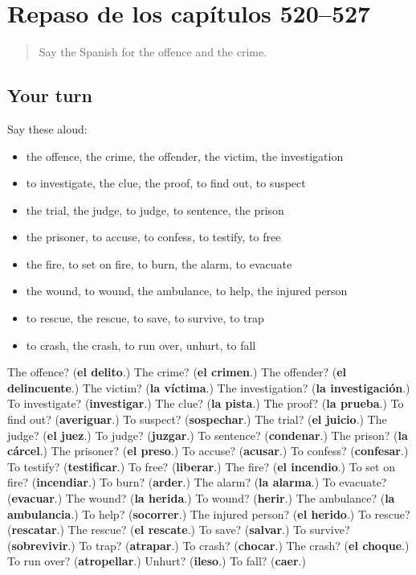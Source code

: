 \section[(dialogue)]{Repaso de los capítulos 520–527}

\label{lesson:ES-R527-repaso-520-527}



\begin{quote}
Say the Spanish for the offence and the crime.
\end{quote}

\subsection*{Your turn}
Say these aloud:

\begin{itemize}
\raggedright
  \item the offence, the crime, the offender, the victim, the investigation
  \item to investigate, the clue, the proof, to find out, to suspect
  \item the trial, the judge, to judge, to sentence, the prison
  \item the prisoner, to accuse, to confess, to testify, to free
  \item the fire, to set on fire, to burn, the alarm, to evacuate
  \item the wound, to wound, the ambulance, to help, the injured person
  \item to rescue, the rescue, to save, to survive, to trap
  \item to crash, the crash, to run over, unhurt, to fall
\end{itemize}

\begin{tcolorbox}[breakable,colback=teal!4,colframe=teal!35!black,title={Before you move on}]
The offence? (\textbf{el delito}.) The crime? (\textbf{el crimen}.) The offender? (\textbf{el delincuente}.) The victim? (\textbf{la víctima}.) The investigation? (\textbf{la investigación}.) To investigate? (\textbf{investigar}.) The clue? (\textbf{la pista}.) The proof? (\textbf{la prueba}.) To find out? (\textbf{averiguar}.) To suspect? (\textbf{sospechar}.) The trial? (\textbf{el juicio}.) The judge? (\textbf{el juez}.) To judge? (\textbf{juzgar}.) To sentence? (\textbf{condenar}.) The prison? (\textbf{la cárcel}.) The prisoner? (\textbf{el preso}.) To accuse? (\textbf{acusar}.) To confess? (\textbf{confesar}.) To testify? (\textbf{testificar}.) To free? (\textbf{liberar}.) The fire? (\textbf{el incendio}.) To set on fire? (\textbf{incendiar}.) To burn? (\textbf{arder}.) The alarm? (\textbf{la alarma}.) To evacuate? (\textbf{evacuar}.) The wound? (\textbf{la herida}.) To wound? (\textbf{herir}.) The ambulance? (\textbf{la ambulancia}.) To help? (\textbf{socorrer}.) The injured person? (\textbf{el herido}.) To rescue? (\textbf{rescatar}.) The rescue? (\textbf{el rescate}.) To save? (\textbf{salvar}.) To survive? (\textbf{sobrevivir}.) To trap? (\textbf{atrapar}.) To crash? (\textbf{chocar}.) The crash? (\textbf{el choque}.) To run over? (\textbf{atropellar}.) Unhurt? (\textbf{ileso}.) To fall? (\textbf{caer}.)
\end{tcolorbox}
